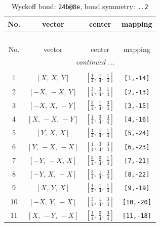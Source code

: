 \documentclass[fleqn,8pt]{jsarticle}
\begin{document}
\begin{longtable}{cccc}
\caption{Wyckoff bond: {\tt 24b@8e}, bond symmetry: {\tt ..2}}
 \\
 \hline \hline
No. & vector & center & mapping \\ \hline \endfirsthead

\multicolumn{3}{l}{\tablename\ \thetable{}} \\
 \hline \hline
No. & vector & center & mapping \\ \hline \endhead

 \hline \hline
\multicolumn{3}{r}{\footnotesize\it continued ...} \\ \endfoot

 \hline \hline
\multicolumn{3}{r}{} \\ \endlastfoot

1 & $\left[ X,\, X,\, Y \right]$ & $\left[ \frac{1}{4},\, \frac{1}{4},\, \frac{1}{4} \right]$ & {\tt [1,-14]} \\ \hline
2 & $\left[ - X,\, - X,\, Y \right]$ & $\left[ \frac{3}{4},\, \frac{3}{4},\, \frac{1}{4} \right]$ & {\tt [2,-13]} \\ \hline
3 & $\left[ - X,\, X,\, - Y \right]$ & $\left[ \frac{3}{4},\, \frac{1}{4},\, \frac{3}{4} \right]$ & {\tt [3,-15]} \\ \hline
4 & $\left[ X,\, - X,\, - Y \right]$ & $\left[ \frac{1}{4},\, \frac{3}{4},\, \frac{3}{4} \right]$ & {\tt [4,-16]} \\ \hline
5 & $\left[ Y,\, X,\, X \right]$ & $\left[ \frac{1}{4},\, \frac{1}{4},\, \frac{1}{4} \right]$ & {\tt [5,-24]} \\ \hline
6 & $\left[ Y,\, - X,\, - X \right]$ & $\left[ \frac{1}{4},\, \frac{3}{4},\, \frac{3}{4} \right]$ & {\tt [6,-23]} \\ \hline
7 & $\left[ - Y,\, - X,\, X \right]$ & $\left[ \frac{3}{4},\, \frac{3}{4},\, \frac{1}{4} \right]$ & {\tt [7,-21]} \\ \hline
8 & $\left[ - Y,\, X,\, - X \right]$ & $\left[ \frac{3}{4},\, \frac{1}{4},\, \frac{3}{4} \right]$ & {\tt [8,-22]} \\ \hline
9 & $\left[ X,\, Y,\, X \right]$ & $\left[ \frac{1}{4},\, \frac{1}{4},\, \frac{1}{4} \right]$ & {\tt [9,-19]} \\ \hline
10 & $\left[ - X,\, Y,\, - X \right]$ & $\left[ \frac{3}{4},\, \frac{1}{4},\, \frac{3}{4} \right]$ & {\tt [10,-20]} \\ \hline
11 & $\left[ X,\, - Y,\, - X \right]$ & $\left[ \frac{1}{4},\, \frac{3}{4},\, \frac{3}{4} \right]$ & {\tt [11,-18]} \\ \hline

\end{longtable}
\end{document}
